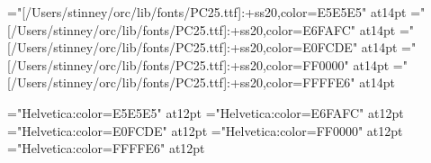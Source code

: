 \def\slnocdli{\vbox{\hbox to\cdliwd{\hfil}\vfil}}
\def\slnodist{\vbox{\hbox to1in{\hfil}\vfil}}
\def\slnoglyf{\vbox{\hbox to\slcwd{\hfil}\vfil}}

\def\tbodyrule{\noalign{\hrule\vskip3pt plus1pt minus1pt}\noalign{\allowbreak}}

\def\tbodybreak{\noalign{\allowbreak}}

\def\sltabrule{\noalign{\hrule\vskip3pt plus1pt minus1pt}}


\font\pceee="[/Users/stinney/orc/lib/fonts/PC25.ttf]:+ss20,color=E5E5E5" at14pt
\font\pceff="[/Users/stinney/orc/lib/fonts/PC25.ttf]:+ss20,color=E6FAFC" at14pt
\font\pcefd="[/Users/stinney/orc/lib/fonts/PC25.ttf]:+ss20,color=E0FCDE" at14pt
\font\pcfee="[/Users/stinney/orc/lib/fonts/PC25.ttf]:+ss20,color=FF0000" at14pt
\font\pcffe="[/Users/stinney/orc/lib/fonts/PC25.ttf]:+ss20,color=FFFFE6" at14pt

\let\redpc\pcfee

\font\hveee="Helvetica:color=E5E5E5" at12pt
\font\hveff="Helvetica:color=E6FAFC" at12pt
\font\hvefd="Helvetica:color=E0FCDE" at12pt
\font\hvfee="Helvetica:color=FF0000" at12pt
\font\hvffe="Helvetica:color=FFFFE6" at12pt

\def\not{\hveee}%
\def\sqchr{\hveff}%
\def\sqinv{\hvefd}%
\def\sqopq{\hvfee}%
\def\sqseq{\hvffe}%

\def\pcnot{\pceee}%
\def\pcsqchr{\pceff}%
\def\pcsqinv{\pcefd}%
\def\pcsqopq{\pcfee}%
\def\pcsqseq{\pcffe}%

\def\ucode#1{\Sans\eight\rm}

\def\tablerule{\noalign{\allowbreak\hrule}}

\def\cctnum#1{\vbox to1.5em{\hbox to\ccwd{\hfil\helv#1\hfil}\vfil}}
\def\cclnum#1{\llap{\vbox to\ccht{\vfil\hbox{\helv#1\kern5pt}\vfil}}}

\let\trhook\relax
\def\tvrule{\vrule}
\def\tvrulex{\vrule width1pt\relax}

\def\thead{\Sans\nine\rm}

\def\codechart{\def\thead{\Sans\nine\rm}%
}

